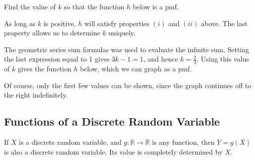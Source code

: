 \begin{example}
Find the value of $k$ so that the function $h$ below is a pmf.
\renewcommand*{\arraystretch}{1.35}
\renewcommand*{\arraystretch}{1}
\par
\noindent As long as $k$ is positive, $h$ will satisfy properties $(i)$ and $(ii)$ above. The last property allows us to determine $k$ uniquely.
\par
\noindent The geometric series sum formulas was used to evaluate the infinite sum. Setting the last expression equal to 1 gives $3k - 1 = 1$, and hence $k = \frac{2}{3}$. Using this value of $k$ gives the function $h$ below, which we can graph as a pmf.
\renewcommand*{\arraystretch}{1.35}
\par
\noindent Of course, only the first few values can be shown, since the graph continues off to the right indefinitely.
\renewcommand*{\arraystretch}{1}
\begin{center}
\end{center}
\end{example}

\subsection*{Functions of a Discrete Random Variable}
\par
If $X$ is a discrete random variable, and $g: \mathbb{R} \to \mathbb{R}$ is any function, then $Y = g(X)$ is also a discrete random variable. Its value is completely determined by $X$.

